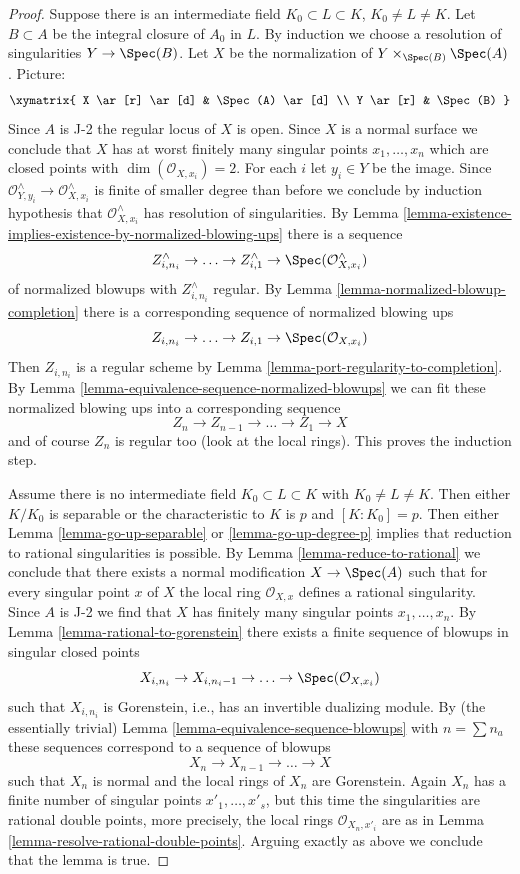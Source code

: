 \begin{proof}
\medskip\noindent
Suppose there is an intermediate field $K_0 \subset L \subset K$,
$K_0 \not = L \not = K$. Let $B \subset A$ be the integral closure
of $A_0$ in $L$. By induction we choose a resolution of singularities
$Y \to \Spec(B)$. Let $X$ be the normalization
of $Y \times_{\Spec(B)} \Spec(A)$. Picture:
$$
\xymatrix{
X \ar[r] \ar[d] & \Spec(A) \ar[d] \\
Y \ar[r] & \Spec(B)
}
$$
Since $A$ is J-2 the regular locus of $X$ is open. Since $X$
is a normal surface we conclude that $X$ has at worst finitely
many singular points $x_1, \ldots, x_n$ which are closed points with
$\dim(\mathcal{O}_{X, x_i}) = 2$.
For each $i$ let $y_i \in Y$ be the image.
Since
$\mathcal{O}_{Y, y_i}^\wedge \to \mathcal{O}_{X, x_i}^\wedge$
is finite of smaller degree than before we conclude by
induction hypothesis that $\mathcal{O}_{X, x_i}^\wedge$
has resolution of singularities. By
Lemma \ref{lemma-existence-implies-existence-by-normalized-blowing-ups}
there is a sequence
$$
Z^\wedge_{i, n_i} \to \ldots \to Z^\wedge_{i, 1} \to
\Spec(\mathcal{O}_{X, x_i}^\wedge)
$$
of normalized blowups with $Z^\wedge_{i, n_i}$ regular.
By Lemma \ref{lemma-normalized-blowup-completion}
there is a corresponding sequence of normalized blowing ups
$$
Z_{i, n_i} \to \ldots \to Z_{i, 1} \to \Spec(\mathcal{O}_{X, x_i})
$$
Then $Z_{i, n_i}$ is a regular scheme by
Lemma \ref{lemma-port-regularity-to-completion}.
By Lemma \ref{lemma-equivalence-sequence-normalized-blowups}
we can fit these normalized blowing ups
into a corresponding sequence
$$
Z_n \to Z_{n - 1} \to \ldots \to Z_1 \to X
$$
and of course $Z_n$ is regular too (look at the local rings).
This proves the induction step.

\medskip\noindent
Assume there is no intermediate field $K_0 \subset L \subset K$
with $K_0 \not = L \not = K$. Then either $K/K_0$ is separable
or the characteristic to $K$ is $p$ and $[K : K_0] = p$.
Then either Lemma \ref{lemma-go-up-separable} or \ref{lemma-go-up-degree-p}
implies that reduction to rational singularities is possible.
By Lemma \ref{lemma-reduce-to-rational} we conclude that there exists a
normal modification $X \to \Spec(A)$ such that for
every singular point $x$ of $X$ the local ring $\mathcal{O}_{X, x}$
defines a rational singularity. Since $A$ is J-2 we find that $X$ has
finitely many singular points $x_1, \ldots, x_n$.
By Lemma \ref{lemma-rational-to-gorenstein}
there exists a finite sequence of blowups in singular closed points
$$
X_{i, n_i} \to X_{i, n_i - 1} \to \ldots \to \Spec(\mathcal{O}_{X, x_i})
$$
such that $X_{i, n_i}$ is Gorenstein, i.e., has an
invertible dualizing module. By (the essentially trivial)
Lemma \ref{lemma-equivalence-sequence-blowups}
with $n = \sum n_a$ these sequences correspond to a sequence of
blowups
$$
X_n \to X_{n - 1} \to \ldots \to X
$$
such that $X_n$ is normal and the local rings of $X_n$ are Gorenstein.
Again $X_n$ has a finite number of singular points
$x'_1, \ldots, x'_s$, but this time the singularities are
rational double points, more precisely, the local rings
$\mathcal{O}_{X_n, x'_i}$ are as in
Lemma \ref{lemma-resolve-rational-double-points}.
Arguing exactly as above we conclude that the lemma is true.
\end{proof}
